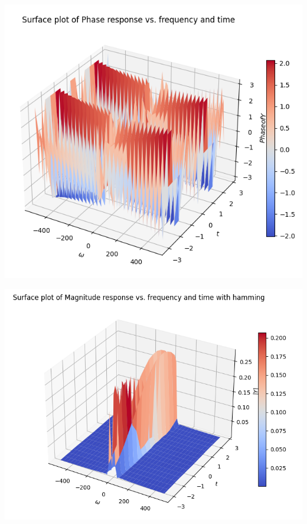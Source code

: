 \documentclass[12pt, a4paper]{report}
\begin{document}
\begin{center}
	\includegraphics[scale=0.55]{Figure_27.png} 
	\label{fig:rawdata}
\end{center}
\clearpage
\begin{center}
	\includegraphics[scale=0.55]{Figure_28.png} 
	\label{fig:rawdata}
\end{center}
\end{document}

